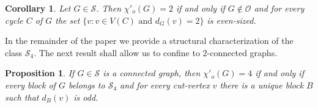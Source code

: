 \documentclass[a4paper,12pt]{article}
\newtheorem{corollary}[theorem]{Corollary}
\newtheorem{proposition}[theorem]{Proposition}
\numberwithin{equation}{section}
\begin{document}
\begin{corollary}
    \label{odd 2-edge-colorability}
Let $G\in\mathcal{S}$. Then $\chi'_o(G)=2$ if and only if $G\notin\mathcal{O}$ and for every cycle $C$ of $G$ the set $\{v:v\in V(C) \text{ and } d_G(v)=2\}$ is even-sized.
\end{corollary}

In the remainder of the paper we provide a structural characterization of the class $\mathcal{S}_4$. The next result shall allow us to confine to $2$-connected graphs.

 \begin{proposition}
    \label{block tree}
 If $G\in\mathcal{S}$ is a connected graph, then  $\chi'_o(G)=4$ if and only if every block of $G$ belongs to $\mathcal{S}_4$ and for every cut-vertex $v$ there is a unique block $B$ such that $d_B(v)$ is odd.

\end{proposition}
\end{document}
